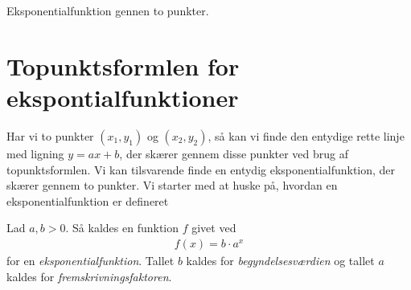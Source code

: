 \begin{center}
\Huge
Eksponentialfunktion gennen to punkter. 
\end{center}
\section*{Topunktsformlen for ekspontialfunktioner}
Har vi to punkter $(x_1,y_1)$ og $(x_2,y_2)$, så kan vi finde den entydige rette linje med ligning $y = ax + b$, der skærer gennem disse punkter ved brug af topunktsformlen. 
Vi kan tilsvarende finde en entydig eksponentialfunktion, der skærer gennem to punkter.
Vi starter med at huske på, hvordan en eksponentialfunktion er defineret
\begin{defn}[Eksponentialfunktion]
	Lad $a,b>0$. Så kaldes en funktion $f$ givet ved
	\begin{align*}
		f(x)=b\cdot a^x
	\end{align*}
	for en \textit{eksponentialfunktion}. Tallet $b$ kaldes for \textit{begyndelsesværdien} og tallet $a$ kaldes for \textit{fremskrivningsfaktoren}.
\end{defn}

